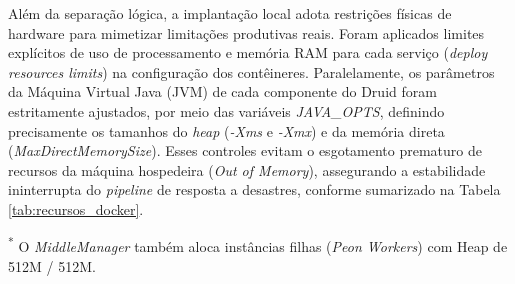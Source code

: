 Além da separação lógica, a implantação local adota restrições físicas de hardware para mimetizar limitações produtivas reais. Foram aplicados limites explícitos de uso de processamento e memória RAM para cada serviço (\textit{deploy resources limits}) na configuração dos contêineres. Paralelamente, os parâmetros da Máquina Virtual Java (JVM) de cada componente do Druid foram estritamente ajustados, por meio das variáveis \textit{JAVA\_OPTS}, definindo precisamente os tamanhos do \textit{heap} (\textit{-Xms} e \textit{-Xmx}) e da memória direta (\textit{MaxDirectMemorySize}). Esses controles evitam o esgotamento prematuro de recursos da máquina hospedeira (\textit{Out of Memory}), assegurando a estabilidade ininterrupta do \textit{pipeline} de resposta a desastres, conforme sumarizado na Tabela \ref{tab:recursos_docker}.

\begin{table}[H]
    \centering
    \caption{Alocação de Recursos e Parâmetros JVM (Docker).}
    \vspace{0.2cm}
    
    \vspace{0.1cm}
    \raggedright
    \footnotesize{\textsuperscript{*} O \textit{MiddleManager} também aloca instâncias filhas (\textit{Peon Workers}) com Heap de 512M / 512M.}
    
    \label{tab:recursos_docker}
\end{table}

